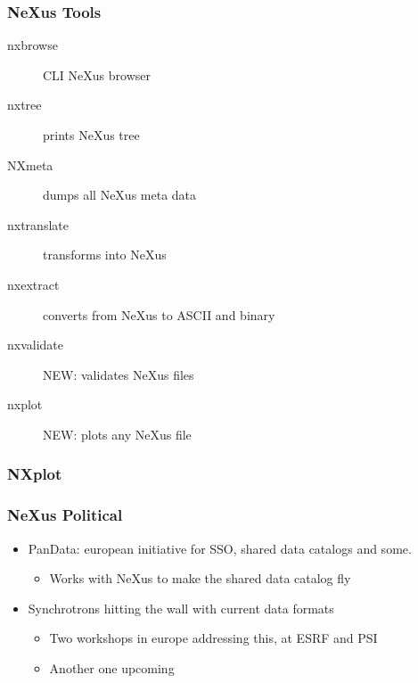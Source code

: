 \documentclass{beamer}
\begin{document}
\begin{frame} \frametitle{NeXus Tools}
\begin{description}
\item[nxbrowse] CLI NeXus browser
\item[nxtree] prints NeXus tree
\item[NXmeta] dumps all NeXus meta data
\item[nxtranslate] transforms into NeXus 
\item[nxextract] converts from NeXus to ASCII and binary
\item[nxvalidate] {\color{red}NEW}: validates NeXus files 
\item[nxplot] {\color{red}NEW}: plots any NeXus file
\end{description}
\end{frame}

\begin{frame} \frametitle{NXplot }
\begin{figure}[!ht]
\end{figure}
\end{frame}




\begin{frame} \frametitle{NeXus Political}
\begin{itemize}
\item PanData: european initiative for SSO, shared data catalogs and some.
\begin{itemize}
\item Works with NeXus to make the shared data catalog fly
\end{itemize}
\item Synchrotrons hitting the wall with current data formats
\begin{itemize}
\item Two workshops in europe addressing this, at ESRF and PSI
\item Another one upcoming
\end{itemize}
\end{itemize}
\end{frame}
\end{document}
